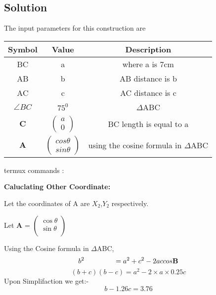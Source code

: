 \documentclass[10pt,a4paper]{report}
\newcommand{\myvec}[1]{\ensuremath{\begin{pmatrix}#1\end{pmatrix}}}
\let\vec\mathbf
\begin{document}
\begin{multicols}{2}
\section{Solution}
The input parameters for this construction are
\begin{center}
\begin{tabular}{|c|c|c|}
	\hline
	\textbf{Symbol}&\textbf{Value}&\textbf{Description}\\
	\hline
	BC & a & where a is 7cm\\
	\hline
	AB & b & AB distance is b \\
	\hline 
	AC & c & AC distance is c \\
	\hline
	$\angle{BC}$ & $75^0$ &  $\Delta$ABC \\
	\hline
	$\vec{C}$ & $\myvec{a\\0}$ & BC length is equal to a\\
	\hline
	$\vec{A}$ & $\myvec{ cos\theta \\ sin\theta}$ & using the cosine formula in $\Delta$ABC\\
	\hline
\end{tabular}
\end{center}
\raggedright {termux commands :}
\begin{center}
\end{center}
\raggedright\textbf{Caluclating Other Coordinate: } \\
\raggedright Let the coordinates of A are $X_{2}$,$Y_{2}$ respectively. \\
  \raggedright Let \textbf{A} =
  $\begin{pmatrix} 
 \cos \theta\\
  \sin\theta \\
\end{pmatrix}$ \\
\raggedright Using the Cosine formula in  $\Delta$ABC, \\ \vspace{3mm}
\begin{equation}
{b}^2\hspace{1.5cm}= {a}^2 + {c}^2 - 2accos\vec{B}
\end{equation}
\begin{equation}
(b+c)(b-c) = {a}^2- 2 \times a \times 0.25c
\end{equation}
Upon Simplifaction we get:- \\
\begin{equation}
  b-1.26c = 3.76
\end{equation}

\end{multicols}
\end{document}
